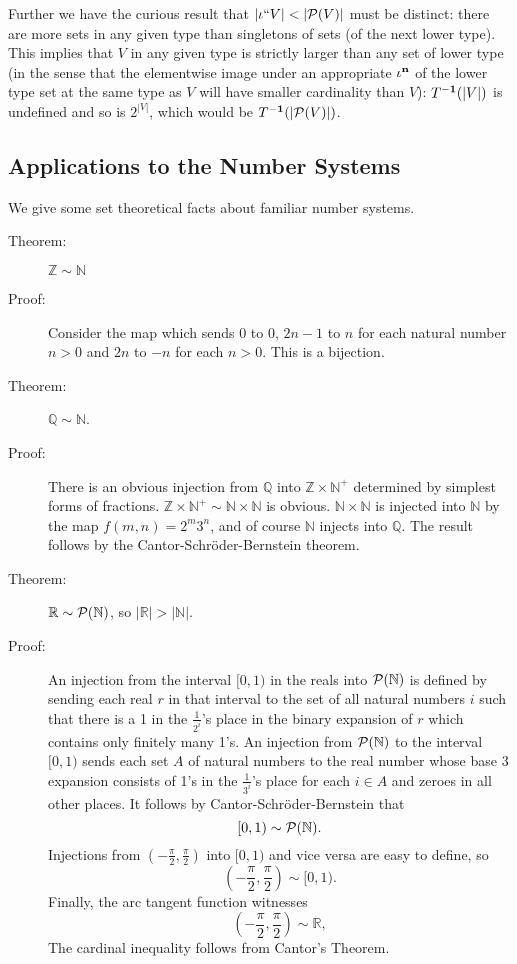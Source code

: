 \documentclass[12pt]{book}
\begin{document}
Further we have the curious result that $|\iota``V| < |{\cal P}(V)|$
must be distinct: there are more sets in any given type than
singletons of sets (of the next lower type).  This implies that $V$ in
any given type is strictly larger than any set of lower type (in the
sense that the elementwise image under an appropriate $\iota^{\bf n}$ of
the lower type set at the same type as $V$ will have smaller
cardinality than $V$): $T^{\bf -1}(|V|)$ is undefined and so is $2^{|V|}$,
which would be $T^{\bf -1}(|{\cal P}(V)|)$.

\subsection{Applications to the Number Systems}

We give some set theoretical facts about familiar number systems.

\begin{description}

\item[Theorem:] ${\mathbb Z} \sim {\mathbb N}$

\item[Proof:] Consider the map which sends 0 to 0, $2n-1$ to $n$ for
each natural number $n>0$ and $2n$ to $-n$ for each $n>0$.  This is a
bijection.

\item[Theorem:] ${\mathbb Q} \sim {\mathbb N}$.

\item[Proof:] There is an obvious injection from $\mathbb Q$ into
${\mathbb Z} \times {\mathbb N}^+$ determined by simplest forms of
fractions.  ${\mathbb Z} \times {\mathbb N}^+ \sim {\mathbb N} \times
{\mathbb N}$ is obvious.  ${\mathbb N}\times {\mathbb N}$ is injected
into $\mathbb N$ by the map $f(m,n) = 2^m3^n$, and of course ${\mathbb
N}$ injects into $\mathbb Q$.  The result follows by the
Cantor-Schr\"oder-Bernstein theorem.

\item[Theorem:] ${\mathbb R} \sim {\cal P}({\mathbb N})$, so
$|{\mathbb R}|>|{\mathbb N}|$.

\item[Proof:] An injection from the interval $[0,1)$ in the reals into
${\cal P}({\mathbb N})$ is defined by sending each real $r$ in that
interval to the set of all natural numbers $i$ such that there is a 1
in the $\frac1{2^i}$'s place in the binary expansion of $r$ which
contains only finitely many 1's.  An injection from ${\cal P}({\mathbb
N})$ to the interval $[0,1)$ sends each set $A$ of natural numbers to
the real number whose base 3 expansion consists of 1's in the
$\frac1{3^i}$'s place for each $i\in A$ and zeroes in all other
places.  It follows by Cantor-Schr\"oder-Bernstein that $$[0,1) \sim
{\cal P}({\mathbb N}).$$ Injections from $(-\frac{\pi}2,\frac{\pi}2)$
into $[0,1)$ and vice versa are easy to define, so
$$(-\frac{\pi}2,\frac{\pi}2) \sim[0,1).$$  Finally, the arc tangent function witnesses $$(-\frac{\pi}2,\frac{\pi}2) \sim {\mathbb R},$$  The cardinal inequality follows from Cantor's Theorem.

\end{description}
\end{document}

